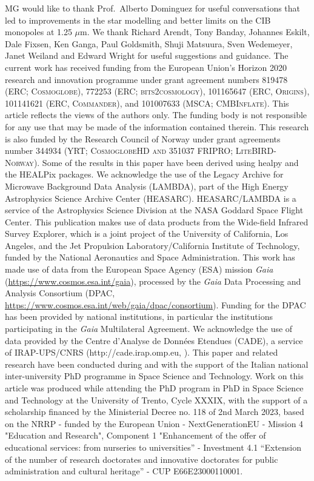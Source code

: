 \documentclass{aa}
\begin{document}
\begin{acknowledgements}
  MG would like to thank Prof.\ Alberto Dominguez for useful
  conversations that led to improvements in the star modelling and
  better limits on the CIB monopoles at 1.25 $\mu$m.  We thank
  Richard Arendt, Tony Banday, Johannes Eskilt, Dale Fixsen,
  Ken Ganga, Paul Goldsmith, Shuji Matsuura, Sven Wedemeyer, Janet
  Weiland and Edward Wright for useful suggestions and
  guidance.  The current work has received funding from the European
  Union’s Horizon 2020 research and innovation programme under grant
  agreement numbers 819478 (ERC; \textsc{Cosmoglobe}), 772253 (ERC;
  \textsc{bits2cosmology}), 101165647 (ERC, \textsc{Origins}),
    101141621 (ERC, \textsc{Commander}), and 101007633 (MSCA;
    \textsc{CMBInflate}).  This article reflects the views of the
    authors only. The funding body is not responsible for any use that
    may be made of the information contained therein. This research is
    also funded by the Research Council of Norway under grant
    agreements number 344934 (YRT; \textsc{CosmoglobeHD and 351037 FRIPRO; LiteBIRD-Norway}). Some of the
  results in this paper have been derived using healpy
  \citep{Zonca2019} and the HEALPix \citep{healpix} packages.  We
  acknowledge the use of the Legacy Archive for Microwave Background
  Data Analysis (LAMBDA), part of the High Energy Astrophysics Science
  Archive Center (HEASARC). HEASARC/LAMBDA is a service of the
  Astrophysics Science Division at the NASA Goddard Space Flight
  Center. This publication makes use of data products from the
  Wide-field Infrared Survey Explorer, which is a joint project of the
  University of California, Los Angeles, and the Jet Propulsion
  Laboratory/California Institute of Technology, funded by the
  National Aeronautics and Space Administration. This work has made
  use of data from the European Space Agency (ESA) mission {\it Gaia}
  (\url{https://www.cosmos.esa.int/gaia}), processed by the {\it Gaia}
  Data Processing and Analysis Consortium (DPAC,
  \url{https://www.cosmos.esa.int/web/gaia/dpac/consortium}). Funding
  for the DPAC has been provided by national institutions, in
  particular the institutions participating in the {\it Gaia}
  Multilateral Agreement.  We acknowledge the use of data provided by
  the Centre d'Analyse de Données Etendues (CADE), a service of
  IRAP-UPS/CNRS (http://cade.irap.omp.eu, \citealt{paradis:2012}).
  This paper and related research have been conducted during and with
  the support of the Italian national inter-university PhD programme
  in Space Science and Technology. Work on this article was produced
  while attending the PhD program in PhD in Space Science and
  Technology at the University of Trento, Cycle XXXIX, with the
  support of a scholarship financed by the Ministerial Decree no. 118
  of 2nd March 2023, based on the NRRP - funded by the European Union
  - NextGenerationEU - Mission 4 "Education and Research", Component 1
  "Enhancement of the offer of educational services: from nurseries to
  universities” - Investment 4.1 “Extension of the number of research
  doctorates and innovative doctorates for public administration and
  cultural heritage” - CUP E66E23000110001.
\end{acknowledgements}


%



\end{document}
